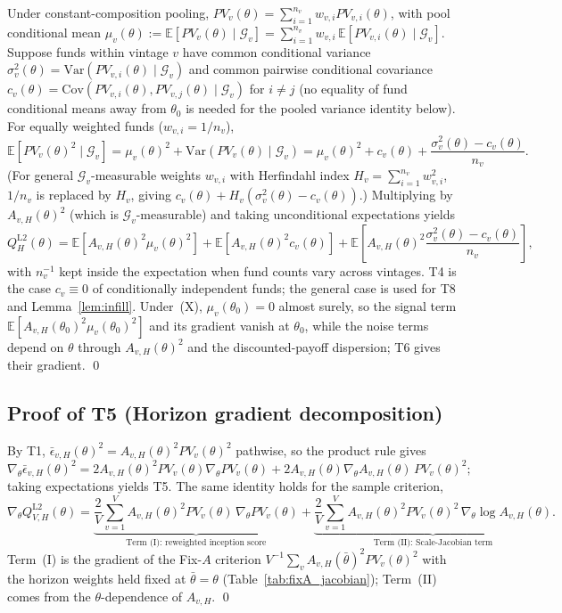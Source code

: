 Under constant-composition pooling, $PV_v(\theta) = \sum_{i=1}^{n_v} w_{v,i} PV_{v,i}(\theta)$, with pool conditional mean $\mu_v(\theta) := \mathbb{E}[PV_v(\theta)\mid\mathcal{G}_v] = \sum_{i=1}^{n_v} w_{v,i}\,\mathbb{E}[PV_{v,i}(\theta)\mid\mathcal{G}_v]$. Suppose funds within vintage $v$ have common conditional variance $\sigma_v^2(\theta) = \mathrm{Var}(PV_{v,i}(\theta)\mid\mathcal{G}_v)$ and common pairwise conditional covariance $c_v(\theta) = \mathrm{Cov}(PV_{v,i}(\theta), PV_{v,j}(\theta)\mid\mathcal{G}_v)$ for $i \neq j$ (no equality of fund conditional means away from $\theta_0$ is needed for the pooled variance identity below). For equally weighted funds ($w_{v,i} = 1/n_v$),
\[
\mathbb{E}[PV_v(\theta)^2\mid\mathcal{G}_v]
= \mu_v(\theta)^2 + \mathrm{Var}(PV_v(\theta)\mid\mathcal{G}_v)
= \mu_v(\theta)^2 + c_v(\theta) + \frac{\sigma_v^2(\theta) - c_v(\theta)}{n_v}.
\]
(For general $\mathcal{G}_v$-measurable weights $w_{v,i}$ with Herfindahl index $H_v = \sum_{i=1}^{n_v} w_{v,i}^2$, $1/n_v$ is replaced by $H_v$, giving $c_v(\theta) + H_v(\sigma_v^2(\theta) - c_v(\theta))$.) Multiplying by $A_{v,H}(\theta)^2$ (which is $\mathcal{G}_v$-measurable) and taking unconditional expectations yields
\[
Q_H^{\mathrm{L2}}(\theta)
= \mathbb{E}\!\left[A_{v,H}(\theta)^2 \mu_v(\theta)^2\right]
+ \mathbb{E}\!\left[A_{v,H}(\theta)^2 c_v(\theta)\right]
+ \mathbb{E}\!\left[A_{v,H}(\theta)^2 \frac{\sigma_v^2(\theta) - c_v(\theta)}{n_v}\right],
\]
with $n_v^{-1}$ kept inside the expectation when fund counts vary across vintages. T4 is the case $c_v \equiv 0$ of conditionally independent funds; the general case is used for T8 and Lemma~\ref{lem:infill}. Under~(X), $\mu_v(\theta_0) = 0$ almost surely, so the signal term $\mathbb{E}[A_{v,H}(\theta_0)^2\mu_v(\theta_0)^2]$ and its gradient vanish at $\theta_0$, while the noise terms depend on $\theta$ through $A_{v,H}(\theta)^2$ and the discounted-payoff dispersion; T6 gives their gradient. \qed

\subsection{Proof of T5 (Horizon gradient decomposition)}
\label{sec:proof_T5}

By T1, $\bar\epsilon_{v,H}(\theta)^2 = A_{v,H}(\theta)^2 PV_v(\theta)^2$ pathwise, so the product rule gives
\[
\nabla_\theta \bar\epsilon_{v,H}(\theta)^2 = 2A_{v,H}(\theta)^2 PV_v(\theta)\nabla_\theta PV_v(\theta) + 2A_{v,H}(\theta)\nabla_\theta A_{v,H}(\theta)\,PV_v(\theta)^2;
\]
taking expectations yields T5. The same identity holds for the sample criterion,
\[
\nabla_\theta Q_{V,H}^{\mathrm{L2}}(\theta)
= \underbrace{\frac{2}{V}\sum_{v=1}^V A_{v,H}(\theta)^2 PV_v(\theta)\,\nabla_\theta PV_v(\theta)}_{\text{Term~(I): reweighted inception score}}
+ \underbrace{\frac{2}{V}\sum_{v=1}^V A_{v,H}(\theta)^2 PV_v(\theta)^2\,\nabla_\theta \log A_{v,H}(\theta)}_{\text{Term~(II): Scale-Jacobian term}}.
\]
Term~(I) is the gradient of the Fix-$A$ criterion $V^{-1}\sum_v A_{v,H}(\bar\theta)^2 PV_v(\theta)^2$ with the horizon weights held fixed at $\bar\theta = \theta$ (Table~\ref{tab:fixA_jacobian}); Term~(II) comes from the $\theta$-dependence of $A_{v,H}$. \qed

